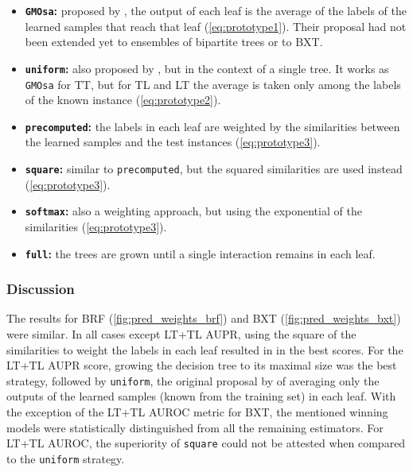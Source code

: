 \begin{itemize}
    \item \textbf{\texttt{GMOsa}:} proposed by , the output of each leaf is the average of the labels of the learned samples that reach that leaf (\autoref{eq:prototype1}). Their proposal had not been extended yet to ensembles of bipartite trees or to BXT.
    \item \textbf{\texttt{uniform}:} also proposed by , but in the context of a single tree. It works as \texttt{GMOsa} for TT, but for TL and LT the average is taken only among the labels of the known instance (\autoref{eq:prototype2}).
    \item \textbf{\texttt{precomputed}:}
    the labels in each leaf are weighted by the similarities between the learned samples and the test instances (\autoref{eq:prototype3}).
    \item \textbf{\texttt{square}:} similar to \texttt{precomputed}, but the squared similarities are used instead (\autoref{eq:prototype3}).
    \item \textbf{\texttt{softmax}:} also a weighting approach, but using the exponential of the similarities (\autoref{eq:prototype3}).
    \item \textbf{\texttt{full}:} the trees are grown until a single interaction remains in each leaf. %
\end{itemize}

\subsubsection{Discussion}


The results for BRF (\autoref{fig:pred_weights_brf}) and BXT (\autoref{fig:pred_weights_bxt}) were similar. In all cases except LT+TL AUPR, using the square of the similarities to weight the labels in each leaf resulted in in the best scores. For the LT+TL AUPR score, growing the decision tree to its maximal size was the best strategy, followed by \texttt{uniform}, the original proposal by  of averaging only the 
outputs of the learned samples (known from the training set) in each leaf. With the exception of the LT+TL AUROC metric for BXT, the mentioned winning models were statistically distinguished from all the remaining estimators. For LT+TL AUROC, the superiority of \texttt{square} could not be attested when compared to the \texttt{uniform} strategy.

